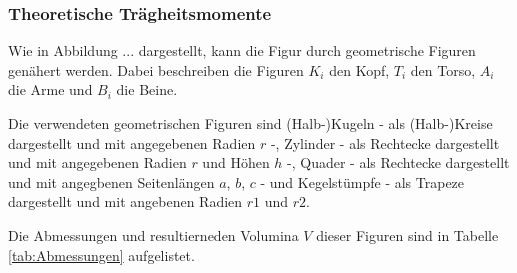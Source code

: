  \subsubsection{Theoretische Trägheitsmomente}

  Wie in Abbildung ... dargestellt, kann die Figur durch geometrische Figuren
  genähert werden. Dabei beschreiben die Figuren $K_i$ den Kopf, $T_i$ den Torso, 
  $A_i$ die Arme und $B_i$ die Beine.
  
  Die verwendeten geometrischen Figuren sind 
  (Halb-)Kugeln - als (Halb-)Kreise dargestellt und mit angegebenen Radien $r$ -, 
  Zylinder - als Rechtecke dargestellt und mit angegebenen Radien $r$ und Höhen $h$ -, 
  Quader - als Rechtecke dargestellt und mit angegbenen Seitenlängen $a$, $b$, $c$ -
  und Kegelstümpfe - als Trapeze dargestellt und mit angebenen Radien $r1$ und $r2$.

  Die Abmessungen und resultierneden Volumina $V$ dieser Figuren sind in Tabelle
  \ref{tab:Abmessungen} aufgelistet.

